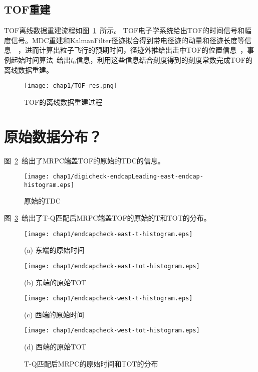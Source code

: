 \subsection{TOF重建}
TOF离线数据重建流程如图~\ref{fig:TOF-res}~所示。
TOF电子学系统给出TOF的时间信号和幅度信号。MDC重建和KalmanFilter径迹拟合得到带电径迹的动量和径迹长度等信息~\cite{wulh2007}~\cite{wangjk2009}，进而计算出粒子飞行的预期时间，径迹外推给出击中TOF的位置信息~\cite{wangll:2014}，事例起始时间算法~\cite{Maxiang:2008}给出$t_{0}$信息，利用这些信息结合刻度得到的刻度常数完成TOF的离线数据重建。
\begin{figure}[!h]
  \centering
  \texttt{[image: chap1/TOF-res.png]}
  \caption{TOF的离线数据重建过程}
  \label{fig:TOF-res}
\end{figure}

\section{原始数据分布？}
图~\ref{fig:digicheck-endcapLeading-east-endcap-histogram}~给出了MRPC端盖TOF的原始的TDC的信息。
\begin{figure}[!h]
  \centering
  \texttt{[image: chap1/digicheck-endcapLeading-east-endcap-histogram.eps]}
  \caption{原始的TDC}
  \label{fig:digicheck-endcapLeading-east-endcap-histogram}
\end{figure}

图~\ref{fig:T and Q}~给出了T-Q匹配后MRPC端盖TOF的原始的T和TOT的分布。
\begin{figure}[!h]
\begin{minipage}{0.48\linewidth}
  \centerline{ \centering \texttt{[image: chap1/endcapcheck-east-t-histogram.eps]}}
  \centerline{(a) 东端的原始时间}
  \centerline{\label{fig:endcapcheck-east-t-histogram}}
\end{minipage}
\begin{minipage}{0.48\linewidth}
  \centerline{ \centering \texttt{[image: chap1/endcapcheck-east-tot-histogram.eps]}}
  \centerline{(b) 东端的原始TOT}
  \centerline{\label{fig:endcapcheck-east-tot-histogram}}
\end{minipage}
\vfill
\begin{minipage}{0.48\linewidth}
  \centerline{ \centering  \texttt{[image: chap1/endcapcheck-west-t-histogram.eps]}}
  \centerline{(c) 西端的原始时间}
  \centerline{\label{fig:endcapcheck-west-t-histogram}}
\end{minipage}
\begin{minipage}{0.48\linewidth}
  \centerline{ \centering \texttt{[image: chap1/endcapcheck-west-tot-histogram.eps]}}
  \centerline{(d) 西端的原始TOT}
  \centerline{\label{fig:endcapcheck-west-tot-histogram}}
\end{minipage}
\caption{T-Q匹配后MRPC的原始时间和TOT的分布}
\label{fig:T and Q}
\end{figure}

